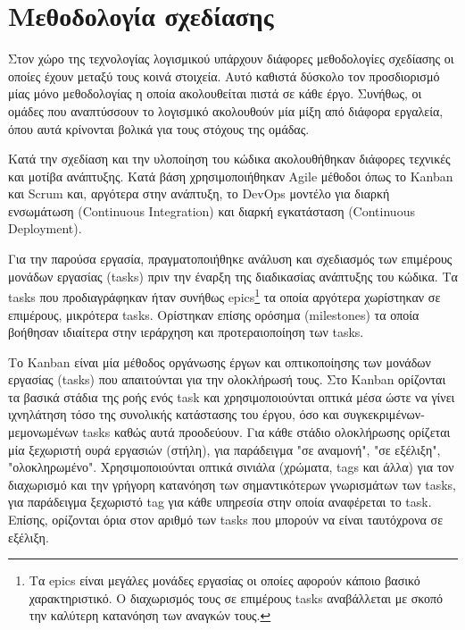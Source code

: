 \section{Μεθοδολογία σχεδίασης} \label{section:3-3-design-methodology}

Στον χώρο της τεχνολογίας λογισμικού υπάρχουν διάφορες μεθοδολογίες σχεδίασης οι οποίες έχουν μεταξύ τους κοινά στοιχεία. Αυτό καθιστά δύσκολο τον προσδιορισμό μίας μόνο μεθοδολογίας η οποία ακολουθείται πιστά σε κάθε έργο. Συνήθως, οι ομάδες που αναπτύσσουν το λογισμικό ακολουθούν μία μίξη από διάφορα εργαλεία, όπου αυτά κρίνονται βολικά για τους στόχους της ομάδας. %

Κατά την σχεδίαση και την υλοποίηση του κώδικα ακολουθήθηκαν διάφορες τεχνικές και μοτίβα ανάπτυξης. Κατά βάση χρησιμοποιήθηκαν Agile μέθοδοι όπως το Kanban και Scrum και, αργότερα στην ανάπτυξη, το DevOps μοντέλο για διαρκή ενσωμάτωση (Continuous Integration) και διαρκή εγκατάσταση (Continuous Deployment).


Για την παρούσα εργασία, πραγματοποιήθηκε ανάλυση και σχεδιασμός των επιμέρους μονάδων εργασίας (tasks) πριν την έναρξη της διαδικασίας ανάπτυξης του κώδικα. Τα tasks που προδιαγράφηκαν ήταν συνήθως epics\footnote{Τα epics είναι μεγάλες μονάδες εργασίας οι οποίες αφορούν κάποιο βασικό χαρακτηριστικό. Ο διαχωρισμός τους σε επιμέρους tasks αναβάλλεται με σκοπό την καλύτερη κατανόηση των αναγκών τους.} τα οποία αργότερα χωρίστηκαν σε επιμέρους, μικρότερα tasks. Ορίστηκαν επίσης ορόσημα (milestones) τα οποία βοήθησαν ιδιαίτερα στην ιεράρχηση και προτεραιοποίηση των tasks.

Το Kanban είναι μία μέθοδος οργάνωσης έργων και οπτικοποίησης των μονάδων εργασίας (tasks) που απαιτούνται για την ολοκλήρωσή τους. Στο Kanban ορίζονται τα βασικά στάδια της ροής ενός task και χρησιμοποιούνται οπτικά μέσα ώστε να γίνει ιχνηλάτηση τόσο της συνολικής κατάστασης του έργου, όσο και συγκεκριμένων-μεμονωμένων tasks καθώς αυτά προοδεύουν. Για κάθε στάδιο ολοκλήρωσης ορίζεται μία ξεχωριστή ουρά εργασιών (στήλη), για παράδειγμα "σε αναμονή", "σε εξέλιξη", "ολοκληρωμένο". Χρησιμοποιούνται οπτικά σινιάλα (χρώματα, tags και άλλα) για τον διαχωρισμό και την γρήγορη κατανόηση των σημαντικότερων γνωρισμάτων των tasks, για παράδειγμα ξεχωριστό tag για κάθε υπηρεσία στην οποία αναφέρεται το task. Επίσης, ορίζονται όρια στον αριθμό των tasks που μπορούν να είναι ταυτόχρονα σε εξέλιξη.

